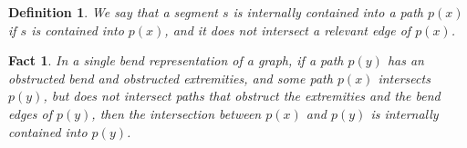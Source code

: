 \documentclass[preprint,12pt]{elsarticle} %
\newtheorem{defi}[theorem]{Definition}
\newtheorem{fact}[theorem]{Fact}
\begin{document}

% 

% 



\begin{defi}
We say that a segment $s$ is \emph{internally contained} into a path $p(x)$ if $s$ is contained into $p(x)$, and it does not intersect a relevant edge of $p(x)$. 
\end{defi}

\begin{fact}
In a single bend representation of a graph, if a path $p(y)$ has an obstructed bend and obstructed extremities, and some path $p(x)$ intersects $p(y)$, but does not intersect paths that obstruct the extremities and the bend edges of $p(y)$, then the intersection between $p(x)$ and $p(y)$ is internally contained into $p(y)$. 
\end{fact}
\end{document}
